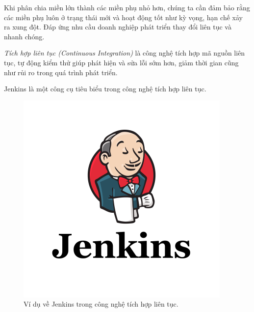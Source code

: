Khi phân chia miền lớn thành các miền phụ nhỏ hơn, chúng ta cần đảm bảo rằng các miền phụ luôn ở trạng thái mới và hoạt động tốt như kỳ vọng, hạn chế xảy ra xung đột. Đáp ứng nhu cầu doanh nghiệp phát triển thay đổi liên tục và nhanh chóng.

\emph{Tích hợp liên tục (Continuous Integration)} là công nghệ tích hợp mã nguồn liên tục, tự động kiểm thử giúp phát hiện và sửa lỗi sớm hơn, giảm thời gian cũng như rủi ro trong quá trình phát triển.

\begin{example} Jenkins là một công cụ tiêu biểu trong công nghệ tích hợp liên tục. \end{example}

\begin{figure}[H]

\centering

\includegraphics[scale = 0.4]{pictures/_vi_du_ve_jenkins_trong_cong_nghe_tich_hop_lien_tuc/main.png}

\caption{Ví dụ về Jenkins trong công nghệ tích hợp liên tục.}

\end{figure}